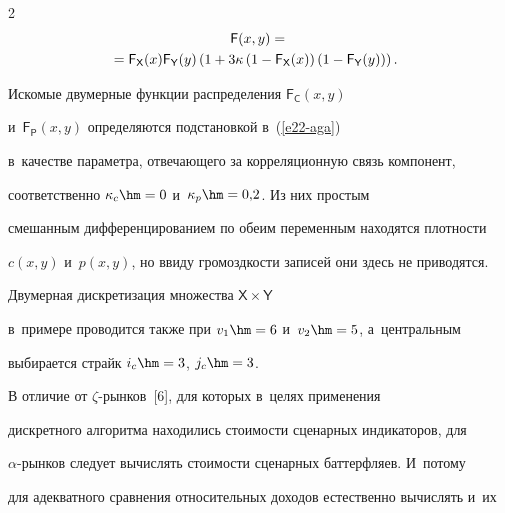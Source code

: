 \begin{multicols}{2}
  \begin{multline}


  {\mathsf F}(x,y)={}\\


\hspace*{-3mm}  {}= {\mathsf F}_{\mathsf X}(x) {\mathsf F}_{\mathsf Y}(y) \left( 


1+3\kappa \left( 1-{\mathsf F}_{\mathsf X}(x)\right) \left(1-{\mathsf F}_{\mathsf 


Y}(y)\right)\right).


  \label{e22-aga}


  \end{multline}


  


\vspace*{-1pt}


 


  Искомые двумерные функции распределения ${\mathsf F}_{\mathsf C}(x,y)$ 


и~${\mathsf F}_{\mathsf P} (x,y)$ определяются подстановкой в~(\ref{e22-aga}) 


в~качестве параметра, отвечающего за корреляционную связь компонент, 


соответственно $\kappa_c\hm=0$ и~$\kappa_p\hm=0{,}2$. Из них простым 


смешанным дифференцированием по обеим переменным находятся плотности 


$c(x,y)$ и~$p(x,y)$, но ввиду громоздкости записей они здесь не приводятся. 


  


  Двумерная дискретизация множества ${\mathsf X}\times \mathsf{Y}$ 


в~примере проводится также при $v_1\hm=6$ и~$v_2\hm=5$, а~центральным 


выбирается страйк $i_c\hm=3$, $j_c\hm=3$. 


  


  В отличие от $\zeta$-рын\-ков~[6], для которых в~целях применения 


дискретного алгоритма находились стоимости сценарных индикаторов, для  


\mbox{$\alpha$-рын}\-ков следует вычислять стоимости сценарных баттерфляев. И~потому 


для адекватного сравнения относительных доходов естественно вычислять и~их 



\end{multicols}
